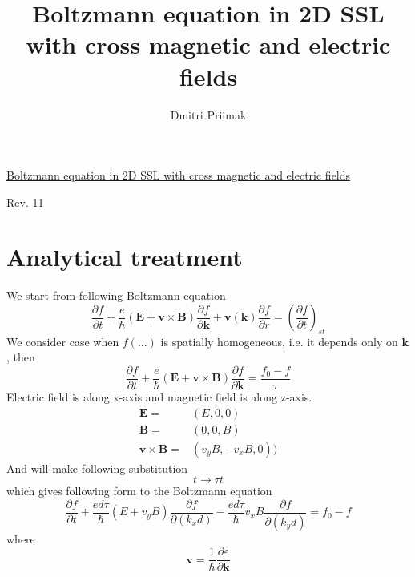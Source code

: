 \documentclass[40pt,letterpaper,physrev]{article}
\author{Dmitri Priimak}
\title{Boltzmann equation in 2D SSL with cross magnetic and electric fields}
\begin{document}
\newcommand{\ddx}[2] {
	\frac{\text{d}#1}{\text{d}#2}
}
\newcommand{\ddt}[1] {
	\frac{\text{d}#1}{\text{d}t}
}
\newcommand{\dtwodt}[1] {
	\frac{\text{d}^{2}#1}{\text{d}t^{2}}
}
 \begin{center}
  \underline{Boltzmann equation in 2D SSL with cross magnetic and electric fields}
 \end{center}
  \begin{center}
    \underline{Rev. 11}
  \end{center}
  \section{Analytical treatment}
	We start from following Boltzmann equation
    \begin{equation}\label{eq:boltzmann}
     \frac{\partial f}{\partial t}+
     \frac{e}{\hbar}\left ( \mathbf{E} + \mathbf{v}\times\mathbf{B} \right ) \frac{\partial f}{\partial\mathbf{k}}+
     \mathbf{v}(\mathbf{k})\frac{\partial f}{\partial r} = \left ( \frac{\partial f}{\partial t} \right )_{st}
    \end{equation}
    We consider case when $f(...)$ is spatially homogeneous, i.e. it depends only on $\mathbf{k}$, then
    \begin{equation}\label{eq:boltzmann_homo}
     \frac{\partial f}{\partial t}+
     \frac{e}{\hbar}\left ( \mathbf{E} + \mathbf{v}\times\mathbf{B} \right ) \frac{\partial f}{\partial\mathbf{k}}
     = \frac{f_0 - f}{\tau}
    \end{equation}
    Electric field is along x-axis and magnetic field is along z-axis.
    \begin{align}
     \mathbf{E}=&(E,0,0) \\
     \mathbf{B}=&(0,0,B) \\
     \mathbf{v}\times\mathbf{B}=&(v_y B, -v_x B, 0))
    \end{align}
    And will make following substitution
    \begin{equation}
     t \to \tau t
    \end{equation}
    which gives following form to the Boltzmann equation
    \begin{equation}
     \frac{\partial f}{\partial t}+
     \frac{ed\tau}{\hbar}(E+v_{y}B)\frac{\partial f}{\partial(k_x d)}-
     \frac{ed\tau}{\hbar}v_{x}B\frac{\partial f}{\partial(k_y d)}
     = f_0 - f
    \end{equation}
    where 
    \begin{equation}
     \mathbf{v}=\frac{1}{\hbar}\frac{\partial\varepsilon}{\partial\mathbf{k}}
    \end{equation}
\end{document}
